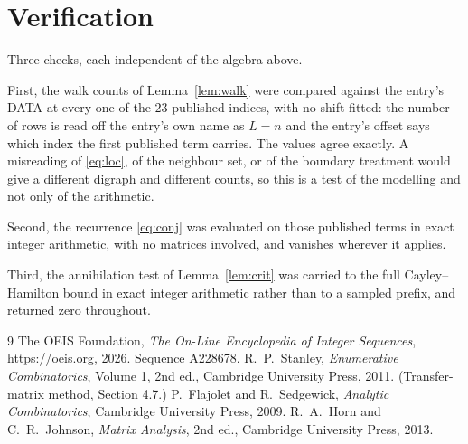 \documentclass[11pt,a4paper]{article}
\theoremstyle{plain}
\theoremstyle{definition}
\begin{document}
\section{Verification}

Three checks, each independent of the algebra above.

First, the walk counts of Lemma~\ref{lem:walk} were compared against the entry's DATA at
every one of the $23$ published indices, with no shift fitted: the number of rows is
read off the entry's own name as $L=n$ and the entry's offset says which index the first
published term carries. The values agree exactly. A misreading of \eqref{eq:loc}, of the
neighbour set, or of the boundary treatment would give a different digraph and different
counts, so this is a test of the modelling and not only of the arithmetic.

Second, the recurrence \eqref{eq:conj} was evaluated on those published terms in exact
integer arithmetic, with no matrices involved, and vanishes wherever it applies.

Third, the annihilation test of Lemma~\ref{lem:crit} was carried to the full
Cayley--Hamilton bound in exact integer arithmetic rather than to a sampled prefix, and
returned zero throughout.

\begin{thebibliography}{9}
 The OEIS Foundation, \emph{The On-Line Encyclopedia of Integer
Sequences}, \url{https://oeis.org}, 2026. Sequence A228678.
 R.~P.~Stanley, \emph{Enumerative Combinatorics}, Volume 1, 2nd ed.,
Cambridge University Press, 2011. (Transfer-matrix method, Section 4.7.)
 P.~Flajolet and R.~Sedgewick, \emph{Analytic Combinatorics}, Cambridge
University Press, 2009.
 R.~A.~Horn and C.~R.~Johnson, \emph{Matrix Analysis}, 2nd ed., Cambridge
University Press, 2013.
\end{thebibliography}
\end{document}
